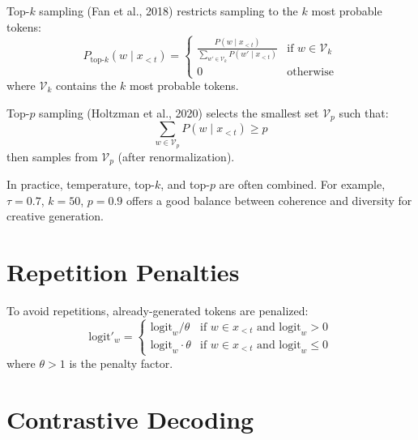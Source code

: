 \begin{definition}
Top-$k$ sampling (Fan et al., 2018) restricts sampling to the $k$ most probable
tokens:
\[
P_{\text{top-}k}(w \mid x_{<t}) = \begin{cases}
\frac{P(w \mid x_{<t})}{\sum_{w' \in \mathcal{V}_k} P(w' \mid x_{<t})} & \text{if } w \in \mathcal{V}_k \\
0 & \text{otherwise}
\end{cases}
\]
where $\mathcal{V}_k$ contains the $k$ most probable tokens.
\end{definition}

\begin{definition}
Top-$p$ sampling (Holtzman et al., 2020) selects the smallest set
$\mathcal{V}_p$ such that:
\[
\sum_{w \in \mathcal{V}_p} P(w \mid x_{<t}) \geq p
\]
then samples from $\mathcal{V}_p$ (after renormalization).
\end{definition}

\begin{bestpractice}[title=\textbf{Combining strategies}]
In practice, temperature, top-$k$, and top-$p$ are often combined. For example,
$\tau = 0.7$, $k = 50$, $p = 0.9$ offers a good balance between coherence and
diversity for creative generation.
\end{bestpractice}

\section{Repetition Penalties}
\label{sec:gen:repetition}

\begin{definition}
To avoid repetitions, already-generated tokens are penalized:
\[
\text{logit}'_w = \begin{cases}
\text{logit}_w / \theta & \text{if } w \in x_{<t} \text{ and } \text{logit}_w > 0 \\
\text{logit}_w \cdot \theta & \text{if } w \in x_{<t} \text{ and } \text{logit}_w \leq 0
\end{cases}
\]
where $\theta > 1$ is the penalty factor.
\end{definition}

\section{Contrastive Decoding}
\label{sec:gen:contrastive}

